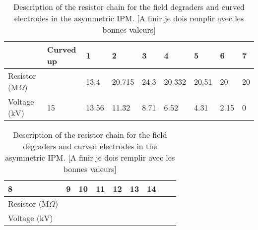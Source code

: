 \begin{table}[ht]
	\centering
	\caption[Description of the resistor chain for the field degraders and curved electrodes in the asymmetric IPM]
	{Description of the resistor chain for the field degraders and curved electrodes in the asymmetric IPM. [A finir je dois remplir avec les bonnes valeurs]}
	\label{chap3:resistor_asym}
	\begin{tabular}{lllllllll}
		\toprule
		                                & Curved up & 1     & 2      & 3    & 4      & 5     & 6    & 7  \\
		\midrule
		Resistor (\(\mathrm{M}\Omega\)) &           & 13.4  & 20.715 & 24.3 & 20.332 & 20.51 & 20   & 20 \\
		Voltage (\(\mathrm{kV}\))       & 15        & 13.56 & 11.32  & 8.71 & 6.52   & 4.31  & 2.15 & 0  \\
		\bottomrule
	\end{tabular}

	\begin{tabular}{lllllllll}
		\toprule
		8                               & 9 & 10 & 11 & 12 & 13 & 14 &  & \\
		\midrule
		Resistor (\(\mathrm{M}\Omega\)) &   &    &    &    &    &    &  & \\
		Voltage (\(\mathrm{kV}\))       &   &    &    &    &    &    &  & \\
		\bottomrule
	\end{tabular}
\end{table}